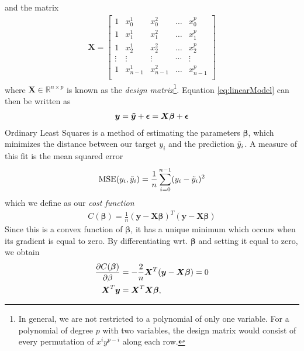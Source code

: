 and the matrix 
\begin{align}
    \boldsymbol{X}=
    \begin{bmatrix} 
    1& x_{0}^1 &x_{0}^2& \dots &x_{0}^{p}\\
    1& x_{1}^1 &x_{1}^2& \dots &x_{1}^{p}\\
    1& x_{2}^1 &x_{2}^2& \dots &x_{2}^{p}\\                      
    \vdots& \vdots &\vdots& \cdots &\vdots\\
    1& x_{n-1}^1 &x_{n-1}^2& \dots &x_{n-1}^{p}\\
    \end{bmatrix}
    \label{eq:designmatrix}
\end{align}
where $\textbf{X} \in \mathbb{R}^{n \times p}$ is known as the \textit{design matrix}\footnote{In general, we are not restricted to a polynomial of only one variable. For a polynomial of degree $p$ with two variables, the design matrix would consist of every permutation of $x^i y^{p-i}$ along each row.}. Equation \ref{eq:linearModel} can then be written as
\begin{align}
    \boldsymbol{y} = \boldsymbol{\Tilde{y}} + \boldsymbol{\epsilon} = \boldsymbol{X\beta} + \boldsymbol{\epsilon}
    \label{eq:OLSmodel}
\end{align}
Ordinary Least Squares is a method of estimating the parameters $\boldsymbol{\beta}$, which minimizes the distance between our target $y_i$ and the prediction $\Tilde{y}_i$. A measure of this fit is the mean squared error \cite[p. 29]{james}
\begin{align}
    \label{eq:MSE}
    \text{MSE}(y_i, \Tilde{y}_i) =  \frac{1}{n} \sum_{i=0}^{n-1} (y_i - \Tilde{y}_i)^2
\end{align}
which we define as our \textit{cost function} 
\begin{align}
    C(\boldsymbol{\beta}) = \frac{1}{n}(\boldsymbol{y} - \boldsymbol{X\beta})^T(\boldsymbol{y} - \boldsymbol{X\beta})
\end{align}
Since this is a convex function of $\boldsymbol{\beta}$, it has a unique minimum which occurs when its gradient is equal to zero. By differentiating wrt. $\boldsymbol{\beta}$ and setting it equal to zero, we obtain
\begin{align}
    \pdv{C(\boldsymbol{\beta})}{\beta} &= -\frac{2}{n}\boldsymbol{X}^T(\boldsymbol{y} - \boldsymbol{X\beta}) = 0\\
    \boldsymbol{X}^T\boldsymbol{y} &= \boldsymbol{X}^T\boldsymbol{X\beta},
\end{align}
